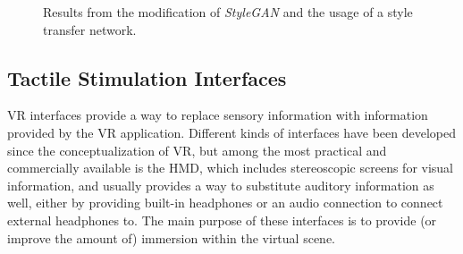 \begin{figure}%
    \centering
    \qquad
    \caption{Results from the modification of \textit{StyleGAN} and the usage of a style transfer network.}%
    \label{fig:schartner2020neural}%
\end{figure}

\subsection{Tactile Stimulation Interfaces}\label{sec:tactile_stimulation_interfaces}
\ac{VR} interfaces provide a way to replace sensory information with information provided by the \ac{VR} application. Different kinds of interfaces have been developed since the conceptualization of \ac{VR}, but among the most practical and commercially available is the \ac{HMD}, which includes stereoscopic screens for visual information, and usually provides a way to substitute auditory information as well, either by providing built-in headphones or an audio connection to connect external headphones to. The main purpose of these interfaces is to provide (or improve the amount of) immersion within the virtual scene.


